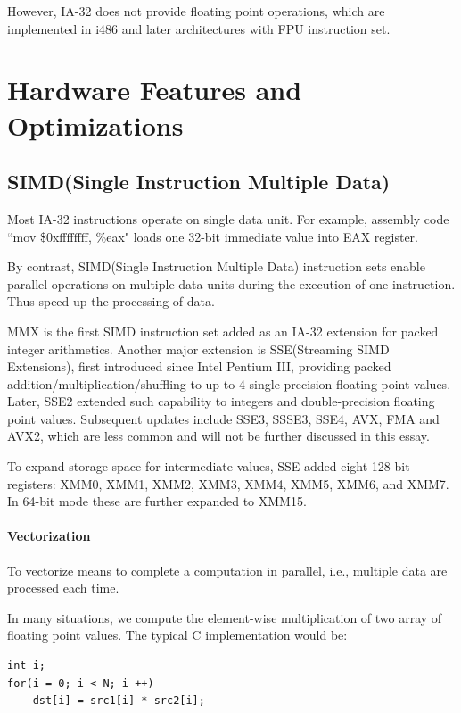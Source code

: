 \documentclass[a4paper]{report}
\begin{document}
	However, IA-32 does not provide floating point operations, which are implemented in i486 and later architectures with FPU instruction set.

\section{Hardware Features and Optimizations} \indent

\subsection{SIMD(Single Instruction Multiple Data)} \indent

	Most IA-32 instructions operate on single data unit. For example, assembly code ``mov \$0xffffffff, \%eax" loads one 32-bit immediate value into EAX register.
	
	By contrast, SIMD(Single Instruction Multiple Data) instruction sets enable parallel operations on multiple data units during the execution of one instruction. Thus speed up the processing of data.

	MMX is the first SIMD instruction set added as an IA-32 extension for packed integer arithmetics. Another major extension is SSE(Streaming SIMD Extensions), first introduced since Intel Pentium III, providing packed addition/multiplication/shuffling to up to 4 single-precision floating point values. Later, SSE2 extended such capability to integers and double-precision floating point values. Subsequent updates include SSE3, SSSE3, SSE4, AVX, FMA and AVX2, which are less common and will not be further discussed in this essay.

	To expand storage space for intermediate values, SSE added eight 128-bit registers: XMM0, XMM1, XMM2, XMM3, XMM4, XMM5, XMM6, and XMM7. In 64-bit mode these are further expanded to XMM15. \cite{inteldev}

\paragraph{Vectorization} \indent \bigskip

	To vectorize means to complete a computation in parallel, i.e., multiple data are processed each time.
	
	In many situations, we compute the element-wise multiplication of two array of floating point values. The typical C implementation would be:
	
        \lstset{language = c, tabsize = 4}
        \begin{lstlisting}
int i;
for(i = 0; i < N; i ++)
	dst[i] = src1[i] * src2[i];
        \end{lstlisting}
\end{document}
